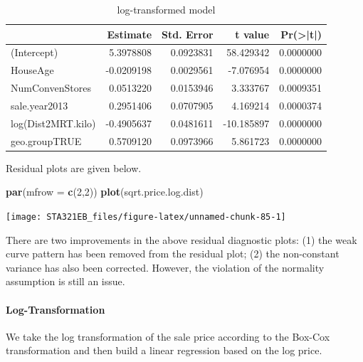 \documentclass[
]{book}
\newenvironment{Shaded}{\begin{snugshade}}{\end{snugshade}}
\newcommand{\AttributeTok}[1]{\textcolor[rgb]{0.13,0.29,0.53}{#1}}
\newcommand{\DecValTok}[1]{\textcolor[rgb]{0.00,0.00,0.81}{#1}}
\newcommand{\FunctionTok}[1]{\textcolor[rgb]{0.13,0.29,0.53}{\textbf{#1}}}
\newcommand{\NormalTok}[1]{#1}
\begin{document}
\begin{table}

\caption{\label{tab:unnamed-chunk-84}log-transformed model}
\centering
\begin{tabular}[t]{l|r|r|r|r}
\hline
  & Estimate & Std. Error & t value & Pr(>|t|)\\
\hline
(Intercept) & 5.3978808 & 0.0923831 & 58.429342 & 0.0000000\\
\hline
HouseAge & -0.0209198 & 0.0029561 & -7.076954 & 0.0000000\\
\hline
NumConvenStores & 0.0513220 & 0.0153946 & 3.333767 & 0.0009351\\
\hline
sale.year2013 & 0.2951406 & 0.0707905 & 4.169214 & 0.0000374\\
\hline
log(Dist2MRT.kilo) & -0.4905637 & 0.0481611 & -10.185897 & 0.0000000\\
\hline
geo.groupTRUE & 0.5709120 & 0.0973966 & 5.861723 & 0.0000000\\
\hline
\end{tabular}
\end{table}

Residual plots are given below.

\begin{Shaded}
\begin{Highlighting}[]
\FunctionTok{par}\NormalTok{(}\AttributeTok{mfrow =} \FunctionTok{c}\NormalTok{(}\DecValTok{2}\NormalTok{,}\DecValTok{2}\NormalTok{))}
\FunctionTok{plot}\NormalTok{(sqrt.price.log.dist)}
\end{Highlighting}
\end{Shaded}

\begin{center}\texttt{[image: STA321EB\_files/figure-latex/unnamed-chunk-85-1]} \end{center}

There are two improvements in the above residual diagnostic plots: (1) the weak curve pattern has been removed from the residual plot; (2) the non-constant variance has also been corrected. However, the violation of the normality assumption is still an issue.

\hypertarget{log-transformation}{%
\paragraph{Log-Transformation}\label{log-transformation}}

We take the log transformation of the sale price according to the Box-Cox transformation and then build a linear regression based on the log price.
\end{document}
